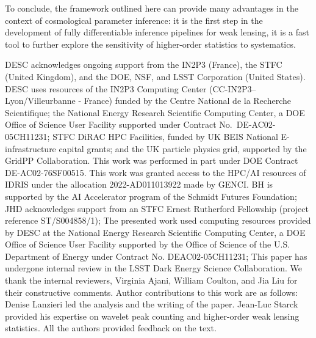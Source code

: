 \documentclass{aa}
\begin{document}
To conclude, the framework outlined here can provide many advantages in the context of cosmological parameter inference:  it is the first step in the development of fully differentiable inference pipelines for weak lensing, it is a fast tool to further explore the sensitivity of higher-order statistics to systematics. 

\begin{acknowledgements}

DESC acknowledges ongoing support from the IN2P3 (France), the STFC 
(United Kingdom), and the DOE, NSF, and LSST Corporation (United States).  
DESC uses resources of the IN2P3 Computing Center 
(CC-IN2P3--Lyon/Villeurbanne - France) funded by the Centre National de la
Recherche Scientifique; the National Energy Research Scientific Computing
Center, a DOE Office of Science User Facility supported under Contract 
No.\ DE-AC02-05CH11231; STFC DiRAC HPC Facilities, funded by UK BEIS National 
E-infrastructure capital grants; and the UK particle physics grid, supported
by the GridPP Collaboration.  This work was performed in part under DOE 
Contract DE-AC02-76SF00515.
This work was granted access to the HPC/AI resources of IDRIS under the allocation 2022-AD011013922 made by GENCI.
BH is supported by the AI Accelerator program of the Schmidt Futures Foundation; JHD acknowledges support from an STFC Ernest Rutherford Fellowship (project reference ST/S004858/1); The presented work used computing resources provided by DESC at the National Energy Research Scientific Computing Center, a DOE Office of Science User Facility supported by the Office of Science of the U.S. Department of Energy under Contract No. DEAC02-05CH11231; 
This paper has undergone internal review in the LSST Dark Energy Science Collaboration. We thank the internal reviewers, Virginia Ajani, William Coulton, and Jia Liu for their constructive comments.
Author contributions to this work are as follows: Denise Lanzieri led the analysis and the writing of the paper.  Jean-Luc Starck provided his expertise on wavelet peak counting and higher-order weak lensing statistics. All the authors provided feedback on
the text.
\end{acknowledgements}
\end{document}
